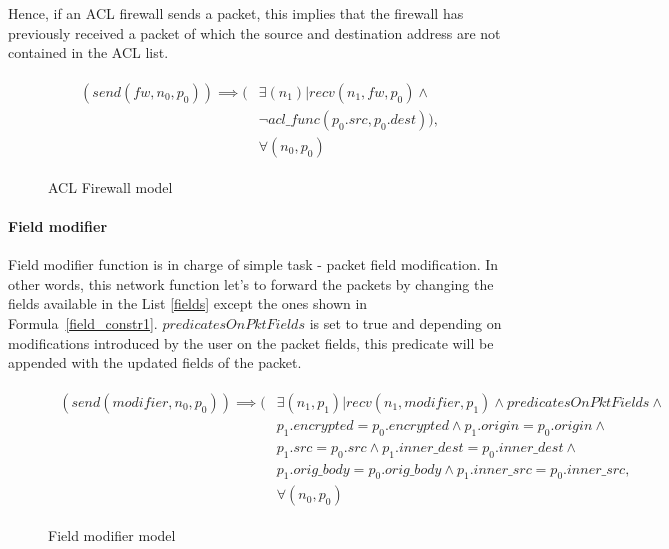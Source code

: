 Hence, if an ACL firewall sends a packet, this implies that the firewall has previously received a packet of which the source and destination address are not contained in the ACL list.
\begin{figure}[h]
	{\footnotesize
		\begin{subequations}
			\begin{align}
				\begin{split}
					\label{acl-fw_constr1}
					(send(fw, n_{0}, p_{0})) \implies (&\exists ( n_{1}) |  recv(n_{1}, fw, p_{0}) \wedge \\
					&\neg acl\_func(p_{0}.src, p_{0}.dest)), \\
					& \forall (n_{0}, p_{0})
				\end{split}
			\end{align}
		\end{subequations}
	}%
	\caption{ACL Firewall model}
	\label{acl-fw_model}
\end{figure}


\paragraph{Field modifier}
Field modifier function is in charge of simple task - packet field modification. In other words, this network function let's to forward the packets by changing the fields available in the List \ref{fields} except the ones shown in Formula~\ref{field_constr1}. $predicatesOnPktFields$ is set to true and depending on modifications introduced by the user on the packet fields, this predicate will be appended with the updated fields of the packet. 
\begin{figure}[h]
	{\footnotesize
		\begin{subequations}
			\begin{align}
				\begin{split}
					\label{field_constr1}
					(send(modifier, n_{0}, p_{0})) \implies (&\exists ( n_{1}, p_{1}) |  recv(n_{1}, modifier, p_{1}) \wedge predicatesOnPktFields \wedge \\
					&   p_{1}.encrypted = p_{0}.encrypted \wedge p_{1}.origin = p_{0}.origin \wedge \\  
					& p_{1}.src = p_{0}.src \wedge p_{1}.inner\_dest = p_{0}.inner\_dest \wedge \\
					& p_{1}.orig\_body = p_{0}.orig\_body \wedge p_{1}.inner\_src = p_{0}.inner\_src ,\\
					& \forall (n_{0}, p_{0})
				\end{split}
			\end{align}
		\end{subequations}
	}%
	\caption{Field modifier model}
	\label{field_model}
\end{figure}

